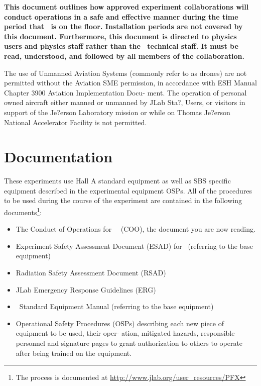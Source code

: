 \documentclass[10pt]{article}
\begin{document}
{\bf This document outlines how approved experiment collaborations will conduct
operations in a safe and effective manner during the time period that 
\EXPTS\  is on the floor. Installation 
periods are not covered by this document. 
Furthermore, this document is directed to physics users and
physics staff rather than the \HALL\ technical staff.  It must be read, 
understood, and followed by all members of the collaboration. }

The use of Unmanned Aviation Systems (commonly refer to as drones) are not permitted without the
Aviation SME permission, in accordance with ESH Manual Chapter 3900 Aviation Implementation Docu-
ment. The operation of personal owned aircraft either manned or unmanned by JLab Sta?, Users, or visitors
in support of the Je?erson Laboratory mission or while on Thomas Je?erson National Accelerator Facility
is not permitted.

\section{Documentation}

These experiments use Hall A standard equipment as well as SBS specific equipment described in the
experimental equipment OSPs. All of the procedures to be used during the course of the experiment are
contained in the following documents\footnote{The process is documented at \url{http://www.jlab.org/user_resources/PFX} }:

\begin{itemize}

\item  The Conduct of Operations for \HALL\ \EXPTS\
 (COO), the document you are now reading. 

\item   Experiment Safety Assessment Document (ESAD)
for \EXPTS\ (referring to the base equipment)

\item Radiation Safety Assessment Document (RSAD) 

\item JLab Emergency Response Guidelines (ERG) 

\item \HALL\ Standard Equipment Manual (referring to the base equipment)

\item Operational Safety Procedures (OSPs) describing each new piece of equipment to be used, their oper-
ation, mitigated hazards, responsible personnel and signature pages to grant authorization to others
to operate after being trained on the equipment. 

\end{itemize}
\end{document}
